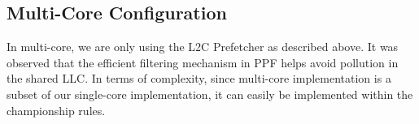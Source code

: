 \subsection{Multi-Core Configuration}
\label{Config-Multi}

In multi-core, we are only using the L2C Prefetcher as described above. It was observed that
the efficient filtering mechanism in PPF helps avoid pollution in the shared LLC. In terms of
complexity, since multi-core implementation is a subset of our single-core implementation, 
it can easily be implemented within the championship rules.
